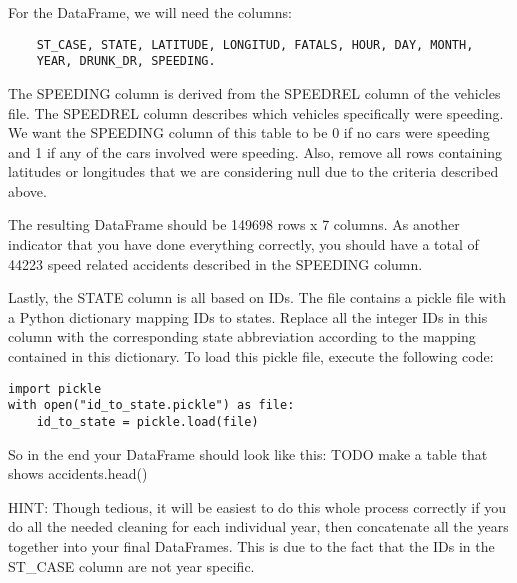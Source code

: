 \begin{problem}
For the  DataFrame, we will need the columns:
\begin{lstlisting}
    ST_CASE, STATE, LATITUDE, LONGITUD, FATALS, HOUR, DAY, MONTH,
    YEAR, DRUNK_DR, SPEEDING.
\end{lstlisting}

The SPEEDING column is derived from
the SPEEDREL column of the vehicles file. The SPEEDREL column describes
which vehicles specifically were speeding. We want the SPEEDING column of this
table to be 0 if no cars were speeding and 1 if any of the cars involved were
speeding. Also, remove all rows containing latitudes or longitudes that we are
considering null due to the criteria described above.

The resulting DataFrame should be 149698 rows x 7 columns. As
another indicator that you have done everything correctly, you should have a total
of 44223 speed related accidents described in the SPEEDING column.

Lastly, the STATE column is all based on IDs. The  file
contains a pickle file with a Python dictionary mapping IDs to states. Replace
all the integer IDs in this column with the corresponding state abbreviation
according to the mapping contained in this dictionary. To load this pickle file,
execute the following code:
\begin{lstlisting}
import pickle
with open("id_to_state.pickle") as file:
    id_to_state = pickle.load(file)
\end{lstlisting}

So in the end your DataFrame should look like this:
TODO make a table that shows accidents.head()

\begin{info}
HINT: Though tedious, it will be easiest to do this whole process correctly if
you do all the needed cleaning for each individual year, then concatenate all
the years together into your final DataFrames. This is due to the fact that
the IDs in the ST\_CASE column are not year specific.
\end{info}
\end{problem}

